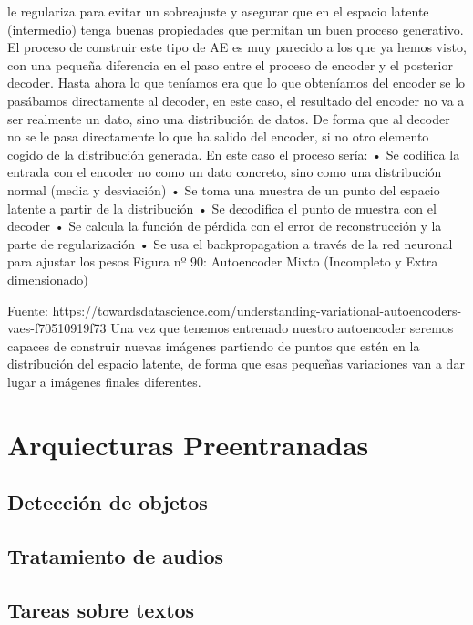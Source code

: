 \documentclass[
  a4paper,
  DIV=11,
  numbers=noendperiod]{scrreprt}
\begin{document}
le regulariza para evitar un sobreajuste y asegurar que en el espacio
latente (intermedio) tenga buenas propiedades que permitan un buen
proceso generativo. El proceso de construir este tipo de AE es muy
parecido a los que ya hemos visto, con una pequeña diferencia en el paso
entre el proceso de encoder y el posterior decoder. Hasta ahora lo que
teníamos era que lo que obteníamos del encoder se lo pasábamos
directamente al decoder, en este caso, el resultado del encoder no va a
ser realmente un dato, sino una distribución de datos. De forma que al
decoder no se le pasa directamente lo que ha salido del encoder, si no
otro elemento cogido de la distribución generada. En este caso el
proceso sería: • Se codifica la entrada con el encoder no como un dato
concreto, sino como una distribución normal (media y desviación) • Se
toma una muestra de un punto del espacio latente a partir de la
distribución • Se decodifica el punto de muestra con el decoder • Se
calcula la función de pérdida con el error de reconstrucción y la parte
de regularización • Se usa el backpropagation a través de la red
neuronal para ajustar los pesos Figura nº 90: Autoencoder Mixto
(Incompleto y Extra dimensionado)

Fuente:
https://towardsdatascience.com/understanding-variational-autoencoders-vaes-f70510919f73
Una vez que tenemos entrenado nuestro autoencoder seremos capaces de
construir nuevas imágenes partiendo de puntos que estén en la
distribución del espacio latente, de forma que esas pequeñas variaciones
van a dar lugar a imágenes finales diferentes.

\hypertarget{arquiecturas-preentranadas}{%
\section{Arquiecturas Preentranadas}\label{arquiecturas-preentranadas}}

\hypertarget{detecciuxf3n-de-objetos}{%
\subsection{Detección de objetos}\label{detecciuxf3n-de-objetos}}

\hypertarget{tratamiento-de-audios}{%
\subsection{Tratamiento de audios}\label{tratamiento-de-audios}}

\hypertarget{tareas-sobre-textos}{%
\subsection{Tareas sobre textos}\label{tareas-sobre-textos}}
\end{document}
